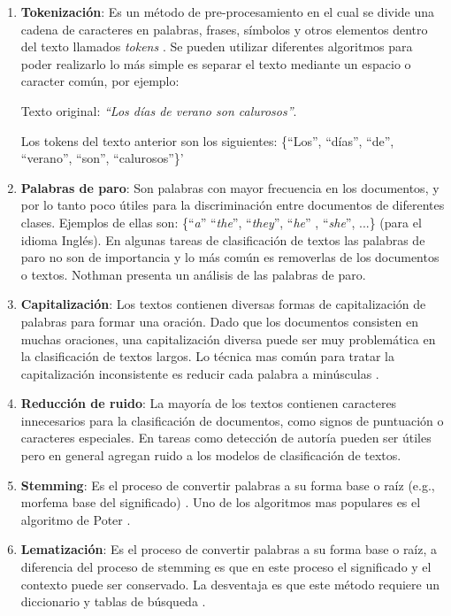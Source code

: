 \begin{enumerate}
\item \textbf{Tokenización}: Es un método de pre-procesamiento en el cual se divide una cadena de caracteres en palabras, frases, símbolos y otros elementos dentro del texto llamados \textit{tokens} \citep{kowsari2019text}. Se pueden utilizar diferentes algoritmos para poder realizarlo lo más simple es separar el texto mediante un espacio o caracter común, por ejemplo:

Texto original: \textit{``Los días de verano son calurosos''}.

Los tokens del texto anterior son los siguientes: \{``Los'',  ``días'', ``de'', ``verano'', ``son'', ``calurosos''\}'

\item \textbf{Palabras de paro}: Son palabras con mayor frecuencia en los documentos, y por lo tanto poco útiles para la discriminación entre documentos de diferentes clases. Ejemplos de ellas son: \{``\textit{a}'' ``\textit{the}'', ``\textit{they}'', ``\textit{he}'' , ``\textit{she}'', ...\} (para el idioma Inglés). En algunas tareas de clasificación de textos las palabras de paro no son de importancia y lo más común es removerlas de los documentos o textos. Nothman \citep{nothman2018stop} presenta un análisis de las palabras de paro.

\item \textbf{Capitalización}: Los textos contienen diversas formas de capitalización de palabras para formar una oración. Dado que los documentos consisten en muchas oraciones, una capitalización diversa puede ser muy problemática en la clasificación de textos largos. Lo técnica mas común para tratar la capitalización inconsistente es reducir cada palabra a minúsculas \citep{kowsari2019text}.

\item \textbf{Reducción de ruido}: La mayoría de los textos contienen caracteres innecesarios para la clasificación de documentos, como signos de puntuación o caracteres especiales. En tareas como detección de autoría pueden ser útiles pero en general agregan ruido a los modelos de clasificación de textos.

\item \textbf{Stemming}: Es el proceso de convertir palabras a su forma base o raíz  (e.g., morfema base del significado) \citep{kamath2019deep}. Uno de los algoritmos mas populares es el algoritmo de Poter \citep{porter2001snowball}.

\item \textbf{Lematización}:  Es el proceso de convertir palabras a su forma base o raíz, a diferencia del proceso de stemming es que en este proceso el significado y el contexto puede ser conservado. La desventaja es que este método requiere un diccionario y tablas de búsqueda \citep{kamath2019deep}.


\end{enumerate}
